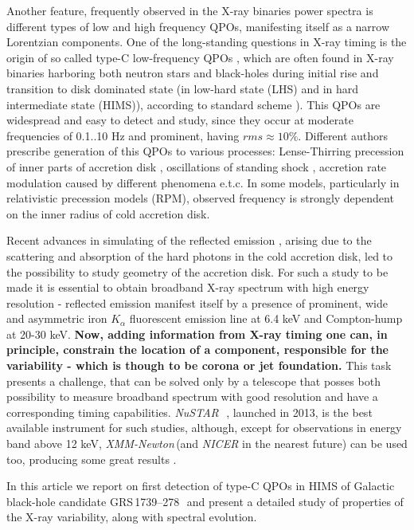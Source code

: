 \documentclass[a4paper,fleqn,usenatbib]{mnras}
\def\grs{{GRS\,1739--278\,}}
\def\xmm{{\em XMM-Newton\,}}
\def\nustar{{\em NuSTAR\,}}
\begin{document}
Another feature, frequently observed in the X-ray binaries power spectra is different types of low and high frequency QPOs, manifesting itself as a narrow Lorentzian components. 
One of the long-standing questions in X-ray timing is the origin of so called type-C low-frequency QPOs \citep[see][for LFQPO classification]{casella05}, which are often found in X-ray binaries harboring both neutron stars and black-holes \citep{wijnands99} during initial rise and transition to disk dominated state (in low-hard state (LHS) and in hard intermediate state (HIMS)), according to standard scheme \citep{grebenev97, tanaka96, remillard06, belloni10}). 
This QPOs are widespread and easy to detect and study, since they occur at moderate frequencies of 0.1..10 Hz and prominent, having $rms\approx10\%$. 
Different authors prescribe generation of this QPOs to various processes: Lense-Thirring precession of inner parts of accretion disk \citep{stella98, ingram09}, oscillations of standing shock \citep{molteni96}, accretion rate modulation caused by different phenomena \citep{tagger99,cabanac10} e.t.c. 
In some models, particularly in relativistic precession models (RPM), observed frequency is strongly dependent on the inner radius of cold accretion disk.  

Recent advances in simulating of the reflected emission \citep{ross05,garcia14}, arising due to the scattering and absorption of the hard photons in the cold accretion disk, led to the possibility to study geometry of the accretion disk. %
For such a study to be made it is essential to obtain broadband X-ray spectrum with high energy resolution - reflected emission manifest itself by a presence of prominent, wide and asymmetric iron $K_{\alpha}$ fluorescent emission line at 6.4 keV and Compton-hump at 20-30 keV. 
{\bf Now, adding information from X-ray timing one can, in principle, constrain the location of a component, responsible for the variability - which is though to be corona or jet foundation.}
This task presents a challenge, that can be solved only by a telescope that posses both possibility to measure broadband spectrum with good resolution and have a corresponding timing capabilities. 
\nustar\, \citep{harrison13_nust}, launched in 2013, is the best available instrument for such studies, although, except for observations in energy band above 12 keV, \xmm (and {\it NICER} in the nearest future) can be used too, producing some great results \citep{ingram16}. 

In this article we report on first detection of type-C QPOs in HIMS of Galactic black-hole candidate \grs\, and present a detailed study of properties of the X-ray variability, along with spectral evolution.
\end{document}
